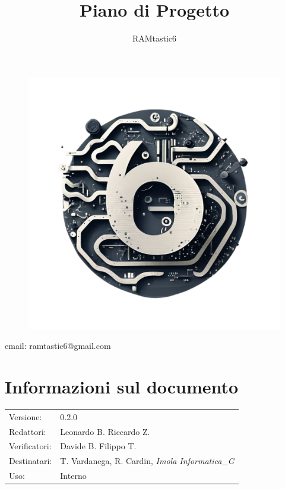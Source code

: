 \documentclass[12pt, oneside]{article}
\author{RAMtastic6}
\begin{document}
\thispagestyle{empty}
\title{Piano di Progetto}
\maketitle
\begin{figure}[h]
  \centering
  \includegraphics[scale=0.3]{logo.png}
\end{figure}
\begin{center}
    email: ramtastic6@gmail.com
\end{center}

\section*{Informazioni sul documento}
\begin{tabular}{ll}
Versione: & 0.2.0 \\
Redattori: & Leonardo B. Riccardo Z.\\
Verificatori: & Davide B. Filippo T.\\ 
Destinatari: & T. Vardanega, R. Cardin, \textit{Imola Informatica_G} \\
Uso: & Interno
\end{tabular}
\newpage

\end{document}
